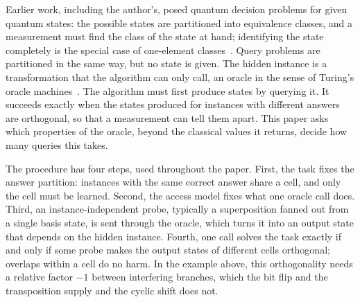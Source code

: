 \documentclass[
  aps,
  pra,
  reprint,
  nofootinbib
]{revtex4-2}
\begin{document}
Earlier work, including the author's, posed quantum decision problems for
given quantum states: the possible states are partitioned into equivalence
classes, and a measurement must find the class of the state at hand;
identifying the state completely is the special case of one-element
classes~\cite{DonSvo01,svozil-2002-statepart-prl,svozil-2005-ko}.
Query problems are partitioned in the same way, but no state is given. The
hidden instance is a transformation that the algorithm can only call, an
oracle in the sense of Turing's oracle machines~\cite{turing-1939}. The
algorithm must first produce states by querying it. It succeeds exactly when
the states produced for instances with different answers are orthogonal, so
that a measurement can tell them apart.
This paper asks which properties of the oracle, beyond the classical values it
returns, decide how many queries this takes.

The procedure has four steps, used throughout the paper. First, the task
fixes the answer partition: instances with the same correct answer share a
cell, and only the cell must be
learned. Second, the access model fixes what one oracle call does. Third, an
instance-independent probe, typically a superposition fanned out from a single
basis state, is sent through the oracle, which turns it into an output state
that depends on the hidden instance. Fourth, one call solves the task exactly
if and only if some probe makes the output states of different cells
orthogonal; overlaps within a cell do no harm. In the example above, this
orthogonality needs a relative factor \(-1\) between interfering branches,
which the bit flip and the transposition supply and the cyclic shift does not.
\end{document}

